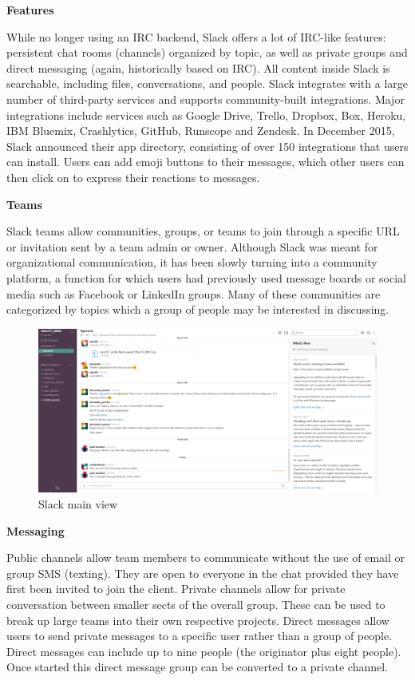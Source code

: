 \textbf{Features}

While no longer using an IRC backend, Slack offers a lot of IRC-like features: persistent chat rooms (channels) organized by topic, as well as private groups and direct messaging (again, historically based on IRC). All content inside Slack is searchable, including files, conversations, and people. Slack integrates with a large number of third-party services and supports community-built integrations. Major integrations include services such as Google Drive, Trello, Dropbox, Box, Heroku, IBM Bluemix, Crashlytics, GitHub, Runscope and Zendesk. In December 2015, Slack announced their app directory, consisting of over 150 integrations that users can install. Users can add emoji buttons to their messages, which other users can then click on to express their reactions to messages.

\textbf{Teams}

Slack teams allow communities, groups, or teams to join through a specific URL or invitation sent by a team admin or owner. Although Slack was meant for organizational communication, it has been slowly turning into a community platform, a function for which users had previously used message boards or social media such as Facebook or LinkedIn groups. Many of these communities are categorized by topics which a group of people may be interested in discussing.
\begin{figure}[h]
	\centering
	\caption{Slack main view}
	\includegraphics[width=\textwidth]{images/slackmainview.png}
\end{figure}

\textbf{Messaging}

Public channels allow team members to communicate without the use of email or group SMS (texting). They are open to everyone in the chat provided they have first been invited to join the client. Private channels allow for private conversation between smaller sects of the overall group. These can be used to break up large teams into their own respective projects. Direct messages allow users to send private messages to a specific user rather than a group of people. Direct messages can include up to nine people (the originator plus eight people). Once started this direct message group can be converted to a private channel.

